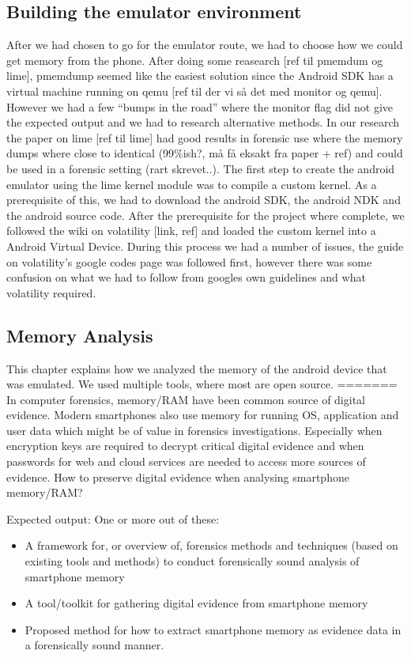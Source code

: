 \subsection{Building the emulator environment}
After we had chosen to go for the emulator route, we had to choose how we could
get memory from the phone. After doing some reasearch [ref til pmemdum og
lime], pmemdump seemed like the easiest solution since the Android SDK has a
virtual machine running on qemu [ref til der vi så det med monitor og qemu].
However we had a few “bumps in the road” where the monitor flag did not give
the expected output and we had to research alternative methods. In our research
the paper on lime [ref til lime] had good results in forensic use where the
memory dumps where close to identical (99\%ish?, må få eksakt fra paper + ref)
and could be used in a forensic setting (rart skrevet..). 
The first step to create the android emulator using the lime kernel module was
to compile a custom kernel. As a prerequisite of this, we had to download the
android SDK, the android NDK and the android source code. After the
prerequisite for the project where complete, we followed the wiki on volatility
[link, ref] and loaded the custom kernel into a Android Virtual Device. During
this process we had a number of issues, the guide on volatility’s google codes
page was followed first, however there was some confusion on what we had to
follow from googles own guidelines and what volatility required.

\subsection{Memory Analysis}
This chapter explains how we analyzed the memory of the android device that was
emulated. We used multiple tools, where most are open source.
=======
In computer forensics, memory/RAM have been common source of digital evidence. 
Modern smartphones also use memory for running OS, application and user data 
which might be of value in forensics investigations. Especially when encryption 
keys are required to decrypt critical digital evidence and when passwords for 
web and cloud services are needed to access more sources of evidence. How to 
preserve digital evidence when analysing smartphone memory/RAM?

Expected output:
One or more out of these:
\begin{itemize}
	\item A framework for, or overview of, forensics methods and techniques (based on existing tools and methods) to conduct forensically sound analysis of smartphone memory
	\item A tool/toolkit for gathering digital evidence from smartphone memory
	\item Proposed method for how to extract smartphone memory as evidence data in a forensically sound manner.
\end{itemize}

